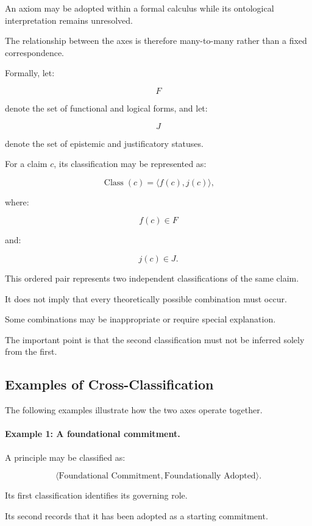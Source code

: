 An axiom may
be adopted
within a formal
calculus while
its ontological
interpretation
remains unresolved.

The relationship
between the
axes is therefore
many-to-many
rather than
a fixed correspondence.

Formally, let:

\[
    F
\]

denote the
set of functional
and logical
forms, and let:

\[
    J
\]

denote the
set of epistemic
and justificatory
statuses.

For a claim
\(c\), its
classification
may be represented
as:

\[
    \operatorname{Class}(c)
    =
    \langle
        f(c),j(c)
    \rangle,
\]

where:

\[
    f(c)\in F
\]

and:

\[
    j(c)\in J.
\]

This ordered
pair represents
two independent
classifications
of the same
claim.

It does not
imply that
every theoretically
possible combination
must occur.

Some combinations
may be inappropriate
or require
special explanation.

The important
point is that
the second
classification
must not be
inferred solely
from the first.

\subsection{Examples of Cross-Classification}

The following
examples illustrate
how the two
axes operate
together.

\paragraph{Example 1: A foundational commitment.}

A principle
may be classified
as:

\[
    \langle
        \text{Foundational Commitment},
        \text{Foundationally Adopted}
    \rangle.
\]

Its first
classification
identifies its
governing role.

Its second
records that
it has been
adopted as
a starting
commitment.

